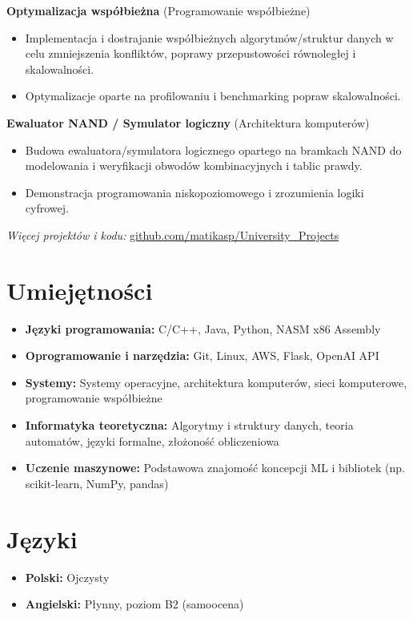 \documentclass[a4paper,10pt]{article}
\begin{document}
\textbf{Optymalizacja współbieżna} \hfill (Programowanie współbieżne)
\begin{itemize}[left=0pt, noitemsep]
    \item Implementacja i dostrajanie współbieżnych algorytmów/struktur danych w celu zmniejszenia konfliktów, poprawy przepustowości równoległej i skalowalności.
    \item Optymalizacje oparte na profilowaniu i benchmarking popraw skalowalności.
\end{itemize}

\textbf{Ewaluator NAND / Symulator logiczny} \hfill (Architektura komputerów)
\begin{itemize}[left=0pt, noitemsep]
    \item Budowa ewaluatora/symulatora logicznego opartego na bramkach NAND do modelowania i weryfikacji obwodów kombinacyjnych i tablic prawdy.
    \item Demonstracja programowania niskopoziomowego i zrozumienia logiki cyfrowej.
\end{itemize}

\small\textit{Więcej projektów i kodu:} \href{https://github.com/matikasp/University_Projects}{github.com/matikasp/University\_Projects}

\section*{Umiejętności}
\begin{itemize}[left=0pt]
    \item \textbf{Języki programowania:} C/C++, Java, Python, NASM x86 Assembly
    \item \textbf{Oprogramowanie i narzędzia:} Git, Linux, AWS, Flask, OpenAI API
    \item \textbf{Systemy:} Systemy operacyjne, architektura komputerów, sieci komputerowe, programowanie współbieżne
    \item \textbf{Informatyka teoretyczna:} Algorytmy i struktury danych, teoria automatów, języki formalne, złożoność obliczeniowa
    \item \textbf{Uczenie maszynowe:} Podstawowa znajomość koncepcji ML i bibliotek (np. scikit-learn, NumPy, pandas)
\end{itemize}

\section*{Języki}
\begin{itemize}[left=0pt]
    \item \textbf{Polski:} Ojczysty
    \item \textbf{Angielski:} Płynny, poziom B2 (samoocena)
\end{itemize}
\end{document}
